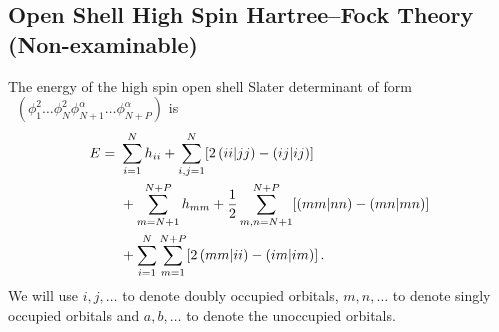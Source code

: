 \documentclass{article}
\theoremstyle{plain}\theoremheaderfont{\normalfont\itshape}\theorembodyfont{\rmfamily}\theoremseparator{.}\newtheorem*{rem}{Remark}\newtheorem*{ex}{Example}\newtheorem*{proof}{Proof}\newtheorem*{altp}{Alternative proof}
\theoremstyle{plain}\theoremheaderfont{\normalfont\bfseries}\theorembodyfont{\rmfamily}\theoremseparator{.}\newtheorem{thm}{Theorem}[section]\newtheorem{lem}[thm]{Lemma}\newtheorem{prop}[thm]{Proposition}\newtheorem*{cor}{Corollary}\newtheorem{defn}[thm]{Definition}\newtheorem{clm}[thm]{Claim}\newtheorem{clminproof}{Claim}
\theoremstyle{break}\theoremheaderfont{\normalfont\itshape}\theorembodyfont{\rmfamily}\theoremseparator{.\medskip}\newtheorem*{proofskip}{Proof}\newtheorem*{exs}{Examples}\newtheorem*{rems}{Remarks}
\theoremstyle{break}\theoremheaderfont{\normalfont\bfseries}\theorembodyfont{\rmfamily}\theoremseparator{.\medskip}\newtheorem{lemskip}[thm]{Lemma}\newtheorem{defnskip}[thm]{Definition}\newtheorem{propskip}[thm]{Proposition}\newtheorem{thmskip}[thm]{Theorem}
\numberwithin{equation}{section}
\newcommand{\bracket}[2]{\left( #1 \middle| #2 \right)}
\DeclareMathOperator{\antisymm}{\hat{\mathcal{A}}}
\begin{document}
    \subsection{Open Shell High Spin Hartree--Fock Theory (Non-examinable)}
    The energy of the high spin open shell Slater determinant of form \(\antisymm(\phi_1^2\dots\phi_N^2\phi_{N+1}^\alpha\dots\phi_{N+P}^\alpha)\) is
    \begin{align}
        E=\ &\sum_{i=1}^{N}h_{ii}+\sum_{i,j=1}^{N}[2\bracket{ii}{jj}-\bracket{ij}{ij}] \notag \\
        &+\sum_{m=N+1}^{N+P}h_{mm}+\frac{1}{2}\sum_{m,n=N+1}^{N+P}[\bracket{mm}{nn}-\bracket{mn}{mn}] \notag \\
        &+\sum_{i=1}^{N}\sum_{m=1}^{N+P}[2\bracket{mm}{ii}-\bracket{im}{im}]\,.
    \end{align}
    We will use \(i,j,\dots\) to denote doubly occupied orbitals, \(m,n,\dots\) to denote singly occupied orbitals and \(a,b,\dots\) to denote the unoccupied orbitals.
    
\end{document}
